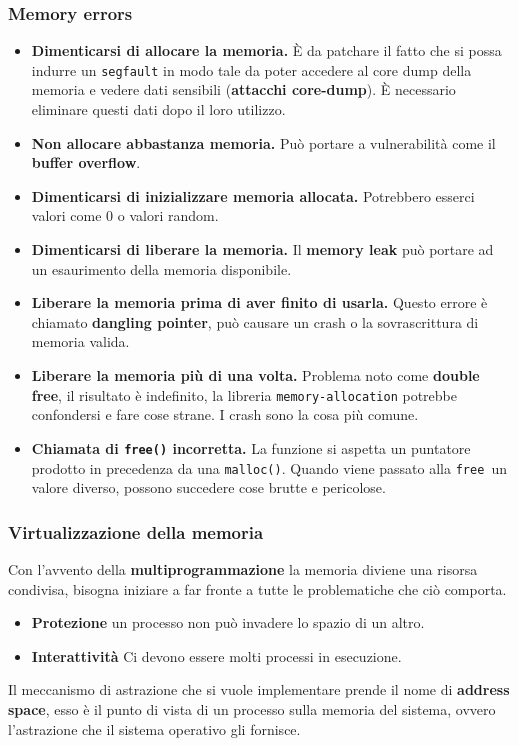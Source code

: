 \documentclass[12pt, letterpaper]{article}
\begin{document}
			\subsubsection{Memory errors}
				\begin{itemize}
					\item \textbf{Dimenticarsi di allocare la memoria.} È da patchare il fatto che si possa indurre un \texttt{segfault} in modo tale da poter accedere al core dump della memoria e vedere dati sensibili (\textbf{attacchi core-dump}). È necessario eliminare questi dati dopo il loro utilizzo. 
					\item \textbf{Non allocare abbastanza memoria.} Può portare a vulnerabilità come il \textbf{buffer overflow}.
					\item \textbf{Dimenticarsi di inizializzare memoria allocata.} Potrebbero esserci valori come 0 o valori random.
					\item \textbf{Dimenticarsi di liberare la memoria.} Il \textbf{memory leak} può portare ad un esaurimento della memoria disponibile.
					\item \textbf{Liberare la memoria prima di aver finito di usarla.} Questo errore è chiamato \textbf{dangling pointer}, può causare un crash o la sovrascrittura di memoria valida.
					\item \textbf{Liberare la memoria più di una volta.} Problema noto come \textbf{double free}, il risultato è indefinito, la libreria \texttt{memory-allocation} potrebbe confondersi e fare cose strane. I crash sono la cosa più comune.
					\item \textbf{Chiamata di \texttt{free()} incorretta.} La funzione si aspetta un puntatore prodotto in precedenza da una \texttt{malloc()}. Quando viene passato alla \texttt{free }un valore diverso, possono succedere cose brutte e pericolose.
				\end{itemize}
				
			\subsubsection{Virtualizzazione della memoria}
				Con l'avvento della \textbf{multiprogrammazione} la memoria diviene una risorsa condivisa, bisogna iniziare a far fronte a tutte le problematiche che ciò comporta.
				\begin{itemize}
					\item \textbf{Protezione} un processo non può invadere lo spazio di un altro.
					\item \textbf{Interattività} Ci devono essere molti processi in esecuzione.								
				\end{itemize}
				Il meccanismo di astrazione che si vuole implementare prende il nome di \textbf{address space}, esso è il punto di vista di un processo sulla memoria del sistema, ovvero l'astrazione che il sistema operativo gli fornisce.
				
\end{document}
